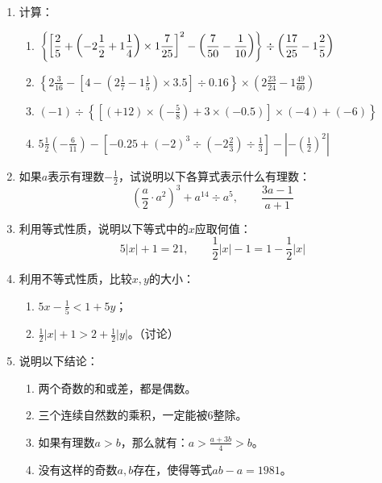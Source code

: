 \begin{enumerate}
	\item 计算：
	\begin{enumerate}
		\item $\left\{\left[\dfrac{2}{5}+\left(-2\dfrac{1}{2}+1\dfrac{1}{4}\right)\times 1\dfrac{7}{25}\right]^2-\left(\dfrac{7}{50}-\dfrac{1}{10}\right)     \right\}\div\left(\dfrac{17}{25}-1 \dfrac{2}{5}\right) $
		\item $\left\{2 \frac{3}{16}-\left[4-\left(2 \frac{1}{7}-1 \frac{1}{5}\right) \times 3.5\right] \div 0.16\right\} 
		\times\left(2 \frac{23}{24}-1 \frac{49}{60}\right) $
		\item $(-1)\div \left\{\left[(+12) \times\left(-\frac{5}{8}\right)+3 \times(-0.5) \right] \times(-4)+(-6)\right\} $
		\item $5 \frac{1}{2}\left(-\frac{6}{11}\right)-\left[-0.25+(-2)^{3}\div \left(-2 \frac{2}{3}\right) \div \frac{1}{3}\right]-\left|-\left(\frac{1}{2}\right)^{2}\right|$
	\end{enumerate}
	
	\item   如果$a$表示有理数$-\frac{1}{2}$，试说明以下各算式表示什么有理数：
	\[\left(\frac{a}{2}\cdot a^2\right)^3+a^{14}\div a^5,\qquad \frac{3a-1}{a+1}  \]
	
	\item   利用等式性质，说明以下等式中的$x$应取何值：
	\[5|x|+1=21,\qquad \frac{1}{2}|x|-1=1-\frac{1}{2}|x|  \]
	
	\item  利用不等式性质，比较$x,  y$的大小：
	\begin{enumerate}
		\item $5x-\frac{1}{5}<1+5y$；
		\item $\frac{1}{2}|x|+1>2+\frac{1}{2}|y|$。（讨论）
	\end{enumerate}
	
	\item 说明以下结论：
	\begin{enumerate}
		\item 两个奇数的和或差，都是偶数。
		\item 三个连续自然数的乘积，一定能被6整除。
		\item 如果有理数$a>b$，那么就有：$a>\frac{a+3b}{4}>b$。
		\item 没有这样的奇数$a,  b$存在，使得等式$ab-a=1981$。
	\end{enumerate}
	
	
\end{enumerate}
